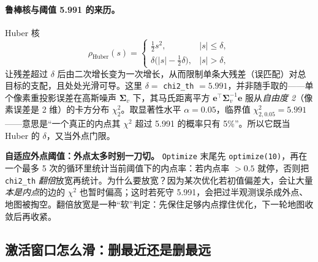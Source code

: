 \paragraph{鲁棒核与阈值 5.991 的来历。}
Huber 核
\begin{equation}
\rho_{\text{Huber}}(s)=\begin{cases}\tfrac12 s^2,& |s|\le\delta,\\[0.4ex] \delta\big(|s|-\tfrac12\delta\big),& |s|>\delta,\end{cases}
\label{eq:sys-huber}
\end{equation}
让残差超过 $\delta$ 后由二次增长变为一次增长，从而限制单条大残差（误匹配）对总目标的支配，且处处光滑可导。这里 $\delta=$ \texttt{chi2\_th} $=5.991$，并非随手取的——单个像素重投影误差在高斯噪声 $\boldsymbol\Sigma_v$ 下，其马氏距离平方 $\mathbf{e}^\top\boldsymbol\Sigma_v^{-1}\mathbf{e}$ 服从\emph{自由度 2}（像素误差是 2 维）的卡方分布 $\chi^2_2$。取显著性水平 $\alpha=0.05$，临界值 $\chi^2_{2,0.05}=5.991$——意思是“一个真正的内点其 $\chi^2$ 超过 5.991 的概率只有 5\%”。所以它既当 Huber 的 $\delta$，又当外点门限。

\begin{insight}
\textbf{自适应外点阈值：外点太多时别一刀切。}
\texttt{Optimize} 末尾先 \texttt{optimize(10)}，再在一个最多 5 次的循环里统计当前阈值下的内点率：若内点率 $>0.5$ 就停，否则把 \texttt{chi2\_th} \emph{翻倍}放宽再统计。为什么要放宽？因为某次优化若初值偏差大，会让大量\emph{本是内点}的边的 $\chi^2$ 也暂时偏高；这时若死守 5.991，会把过半观测误杀成外点、地图被掏空。翻倍放宽是一种“软”判定：先保住足够内点撑住优化，下一轮地图收敛后再收紧。
\end{insight}


\subsection{激活窗口怎么滑：删最近还是删最远}
\label{sec:sys-slidewindow}

